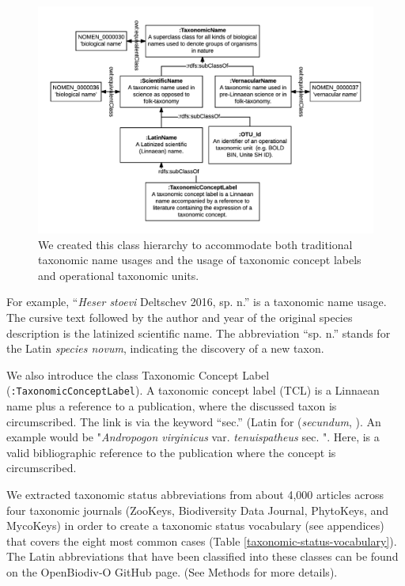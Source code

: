 \begin{figure}[h!]
  \centering
  \includegraphics[width=\textwidth]{Figures/taxonomic-name-class-hierarchy-diagram}
  \decoRule
  \caption[Taxonomic name class hierarchy diagram.]{We created this class hierarchy to accommodate both traditional taxonomic name usages and the usage of taxonomic concept labels and operational taxonomic units.}
  \label{taxonomic-name-class-hierarchy-diagram}
\end{figure}

For example, ``\emph{Heser stoevi} Deltschev 2016, sp. n.'' is a taxonomic name usage. The cursive text followed by the author and year of the original species description is the latinized scientific name. The abbreviation ``sp. n.'' stands for the Latin \emph{species novum}, indicating the discovery of a new taxon.

We also introduce the class Taxonomic Concept Label ({\tt :TaxonomicConceptLabel}). A taxonomic concept label (TCL) is a Linnaean name plus a reference to a publication, where the discussed taxon is circumscribed. The link is via the keyword ``sec.'' (Latin for (\emph{secundum}, \cite{berendsohn_concept_1995}). An example would be "\emph{Andropogon virginicus} var. \emph{tenuispatheus} sec. \cite{blomquist_grasses_1948}". Here, \cite{blomquist_grasses_1948} is a valid bibliographic reference to the publication where the concept is circumscribed.

We extracted taxonomic status abbreviations from about 4,000 articles across four taxonomic journals (ZooKeys, Biodiversity Data Journal, PhytoKeys, and MycoKeys) in order to create a taxonomic status vocabulary (see appendices) that covers the eight most common cases (Table \ref{taxonomic-status-vocabulary}). The Latin abbreviations that have been classified into these classes can be found on the OpenBiodiv-O GitHub page. (See Methods for more details).


